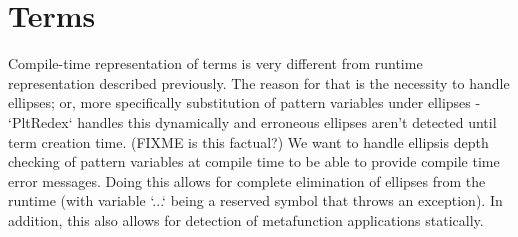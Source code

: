 \section{Terms}

Compile-time representation of terms is very different from runtime representation described previously. The reason for that is the necessity to handle ellipses; or, more specifically substitution of pattern variables under ellipses - `PltRedex` handles this dynamically and erroneous ellipses aren't detected until term creation time.
(FIXME is this factual?)
We want to handle ellipsis depth checking of pattern variables at compile time to be able to provide compile time error messages. Doing this allows for complete elimination of ellipses from the runtime (with variable `...` being a reserved symbol that throws an exception). In addition, this also allows for detection of metafunction applications statically.

